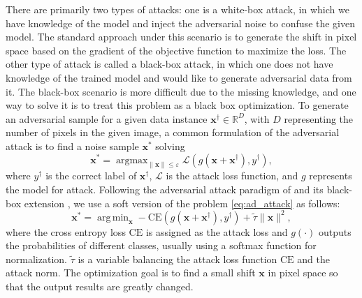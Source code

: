 \documentclass[10pt]{article} %
\numberwithin{equation}{section}
\theoremstyle{plain}
\theoremstyle{definition}
\newcommand{\<}{\langle}
\renewcommand{\>}{\rangle}
\renewcommand{\(}{\left(}
\renewcommand{\)}{\right)}
\renewcommand{\[}{\left[}
\renewcommand{\]}{\right]}
\DeclareMathOperator*{\argmin}{arg\,min}
\def\R{{\mathbb R}}
\def\R{{\mathbb R}}
\DeclareMathOperator*{\argmax}{argmax} %
\begin{document}
There are primarily two types of attacks: one is a white-box attack, in which we have knowledge of the model and inject the adversarial noise to confuse the given model. The standard approach under this scenario is to generate the shift in pixel space based on the gradient of the objective function to maximize the loss. The other type of attack is called a black-box attack, in which one does not have knowledge of the trained model and would like to generate adversarial data from it. The black-box scenario is more difficult due to the missing knowledge, and one way to solve it is to treat this problem as a black box optimization. To generate an adversarial sample for a given data instance $\bm x^\dagger\in\R^D$, with $D$ representing the number of pixels in the given image, a common formulation  of the adversarial attack is to find a noise sample  $\bm x^*$ solving 
\begin{equation}
\label{eq:ad_attack}
\bm x^* = \argmax_{\lVert\bm x\rVert\leq\varepsilon} \mathcal{L}\left(g(\bm x + \bm x^\dagger), y^\dagger\right),
\end{equation}
where $y^\dagger$ is the correct label of $\bm x^\dagger$, $\mathcal{L}$ is the attack loss function, and $g$ represents the model for attack. Following the adversarial attack paradigm of \citet{carlini2017towards} and its black-box extension \citep{chen2017zoo}, we use a soft version of the problem \eqref{eq:ad_attack} as follows: 
\begin{equation}
\bm x^* = \argmin_{\bm x} -\text{CE}\left(g(\bm x + \bm x^\dagger), {y^\dagger}\right) + \tilde{\tau}\lVert\bm x\rVert^2,
\end{equation}
where the cross entropy loss $\text{CE}$ is assigned as the attack loss and $g(\cdot)$ outputs the probabilities of different classes, usually using a softmax function for normalization. $\tilde{\tau}$ is a variable balancing the attack loss function $\text{CE}$ and the attack norm. The optimization goal is to find a small shift $\bm x$ in pixel space so that the output results are greatly changed.
\end{document}
